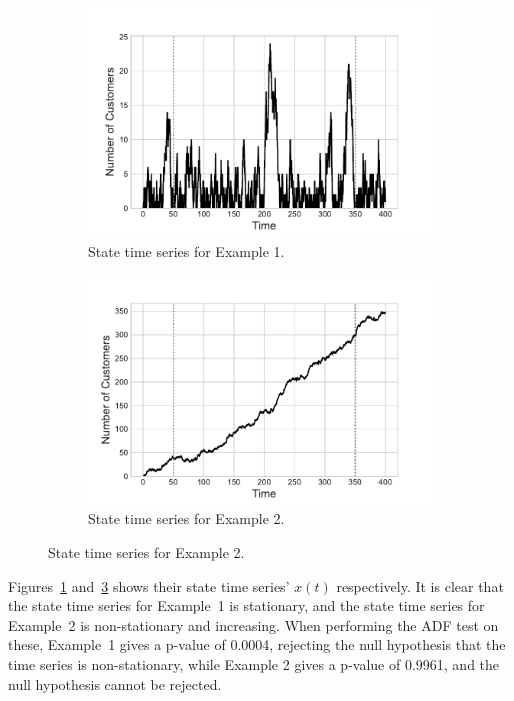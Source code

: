 \documentclass{article}
\begin{document}
\begin{figure}[!htbp]
  \begin{center}
  \begin{subfigure}[b]{0.45\textwidth}
    \includegraphics[width=\textwidth]{img/adf_test_steadystate.pdf}
    \caption{State time series for Example 1.}
    \label{fig:timeseries1}
  \end{subfigure}
  \begin{subfigure}[b]{0.45\textwidth}
    \includegraphics[width=\textwidth]{img/adf_test_not_steadystate.pdf}
    \caption{State time series for Example 2.}
    \label{fig:timeseries2}
  \end{subfigure}
  \end{center}
\end{figure}


Figures~\ref{fig:timeseries1} and~\ref{fig:timeseries2} shows their state time
series' $x(t)$ respectively. It is clear that the state time series for
Example~1 is stationary, and the state time series for Example~2 is
non-stationary and increasing. When performing the ADF test on these, Example~1
gives a p-value of 0.0004, rejecting the null hypothesis that the time series is
non-stationary, while Example 2 gives a p-value of 0.9961, and the null
hypothesis cannot be rejected.
\end{document}
